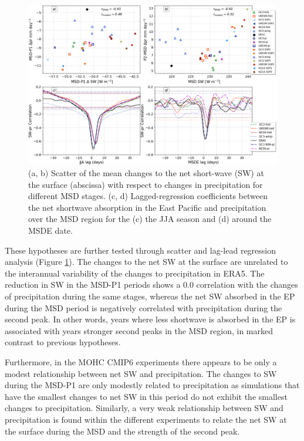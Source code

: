 \begin{figure}[t!]
\includegraphics[width=\linewidth]{figures/cloud_scatter_f.png}
\caption[Scatterplot and lagged-regression of surface short-wave]{(a, b) Scatter of the mean changes to the net short-wave (SW) at the surface (abscissa) with respect to changes in precipitation for different MSD stages. (c, d) Lagged-regression coefficients between the net shortwave absorption in the East Pacific and precipitation over the MSD region for the (c) the JJA season and (d) around the MSDE date.}
\label{fig:cloud_scatter}
\end{figure}

These hypotheses are further tested through scatter and lag-lead regression analysis (Figure \ref{fig:cloud_scatter}). The changes to the net SW at the surface are unrelated to the interannual variability of the changes to precipitation in ERA5. The reduction in SW in the MSD-P1 periods shows a 0.0 correlation with the changes of precipitation during the same stages, whereas the net SW absorbed in the EP during the MSD period is negatively correlated with precipitation during the second peak. In other words, years where less shortwave is absorbed in the EP is associated with years stronger second peaks in the MSD region, in marked contrast to previous hypotheses. 

Furthermore, in the MOHC CMIP6 experiments there appears to be only a modest relationship between net SW and precipitation. The changes to SW during the MSD-P1 are only modestly related to precipitation as simulations that have the smallest changes to net SW in this period do not exhibit the smallest changes to precipitation. Similarly, a very weak relationship between SW and precipitation is found within the different experiments to relate the net SW at the surface during the MSD and the strength of the second peak. 

